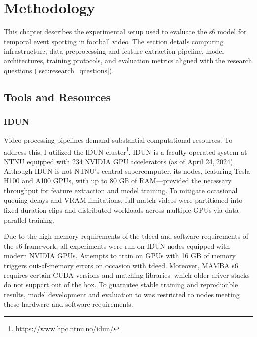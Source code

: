 \chapter{Methodology} 
\label{chap:methodology}
This chapter describes the experimental setup used to evaluate the \acrfull{s6} model for temporal event spotting in football video. The section details computing infrastructure, data preprocessing and feature extraction pipeline, model architectures, training protocols, and evaluation metrics aligned with the research questions (\autoref{sec:research_questions}).


\section{Tools and Resources}
\label{sec:tools_and_resources}

\subsection{IDUN}
\label{ssec:idun}
Video processing pipelines demand substantial computational resources. To address this, I utilized the IDUN cluster\footnote{\url{https://www.hpc.ntnu.no/idun/}}. IDUN is a faculty-operated system at NTNU equipped with 234 NVIDIA GPU accelerators (as of April 24, 2024). Although IDUN is not NTNU's central supercomputer, its nodes, featuring Tesla H100 and A100 GPUs, with up to 80 GB of RAM—provided the necessary throughput for feature extraction and model training. To mitigate occasional queuing delays and VRAM limitations, full-match videos were partitioned into fixed-duration clips and distributed workloads across multiple GPUs via data-parallel training.

Due to the high memory requirements of the \acrlong{tdeed} and software requirements of the \acrlong{s6} framework, all experiments were run on IDUN nodes equipped with modern NVIDIA GPUs. Attempts to train on GPUs with 16 GB of memory triggers out-of-memory errors on occasion with \acrshort{tdeed}. Moreover, MAMBA \acrshort{s6} requires certain CUDA versions and matching libraries, which older driver stacks do not support out of the box. To guarantee stable training and reproducible results, model development and evaluation to was restricted to nodes meeting these hardware and software requirements. 

